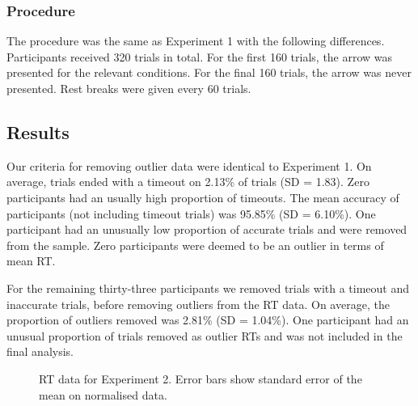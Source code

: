 \documentclass[
  man,
  floatsintext,
  longtable,
  nolmodern,
  notxfonts,
  notimes,
  colorlinks=true,linkcolor=blue,citecolor=blue,urlcolor=blue]{apa7}
\begin{document}
\subsubsection{Procedure}\label{procedure-1}

The procedure was the same as Experiment 1 with the following
differences. Participants received 320 trials in total. For the first
160 trials, the arrow was presented for the relevant conditions. For the
final 160 trials, the arrow was never presented. Rest breaks were given
every 60 trials.

\subsection{Results}\label{results-1}

Our criteria for removing outlier data were identical to Experiment 1.
On average, trials ended with a timeout on 2.13\% of trials (SD = 1.83).
Zero participants had an usually high proportion of timeouts. The mean
accuracy of participants (not including timeout trials) was 95.85\% (SD
= 6.10\%). One participant had an unusually low proportion of accurate
trials and were removed from the sample. Zero participants were deemed
to be an outlier in terms of mean RT.

For the remaining thirty-three participants we removed trials with a
timeout and inaccurate trials, before removing outliers from the RT
data. On average, the proportion of outliers removed was 2.81\% (SD =
1.04\%). One participant had an unusual proportion of trials removed as
outlier RTs and was not included in the final analysis.

\begin{figure}[H]


\caption{\label{fig-RT-exp2}RT data for Experiment 2. Error bars show
standard error of the mean on normalised data.}

\end{figure}%
\end{document}
